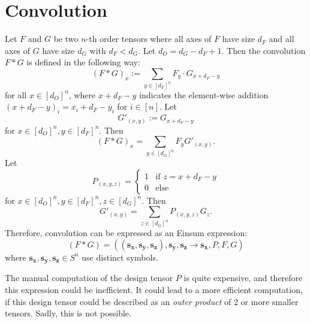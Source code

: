 \section{Convolution}

Let $F$ and $G$ be two $n$-th order tensors where all axes of $F$ have size $d_F$ and all axes of $G$ have size $d_G$ with $d_F < d_G$.
Let $d_O = d_G - d_F + 1$.
Then the convolution $F * G$ is defined in the following way:
$$(F * G)_x := \sum\limits_{y \in [d_F]^n} F_y \cdot G_{x + d_F - y}$$
for all $x \in [d_O]^n$, where $x + d_F - y$ indicates the element-wise addition $(x + d_F - y)_i = x_i + d_F - y_i$ for $i \in [n]$.
Let
$$G'_{(x, y)} := G_{x + d_F - y}$$
for $x \in [d_O]^n, y \in [d_F]^n$.
Then
$$(F * G)_x = \sum\limits_{y \in [d_G]^n} F_y G'_{(x, y)}.$$
Let
$$P_{(x, y, z)} = \begin{cases}
        1 & \text{if } z = x + d_F - y \\
        0 & \text{else}
    \end{cases}$$
for $x \in [d_O]^n, y \in [d_F]^n, z \in [d_G]^n$.
Then
$$G'_{(x, y)} = \sum\limits_{z \in [d_G]^n} P_{(x, y, z)} G_z.$$
Therefore, convolution can be expressed as an Einsum expression:
$$(F * G) = ((\bm{s_x},\bm{s_y},\bm{s_z}),\bm{s_y}, \bm{s_z}  \rightarrow \bm{s_x}, P, F, G)$$
where $\bm{s_x},\bm{s_y},\bm{s_z} \in S^n$ use distinct symbols.

The manual computation of the design tensor $P$ is quite expensive, and therefore this expression could be inefficient.
It could lead to a more efficient computation, if this design tensor could be described as an \textit{outer product} of 2 or more smaller tensors.
Sadly, this is not possible.

